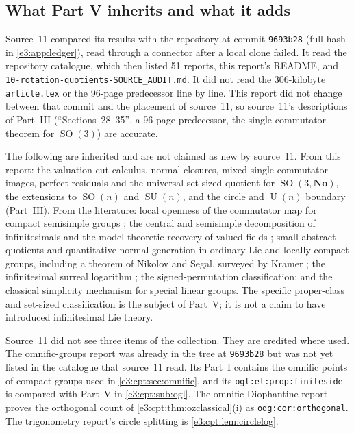 \documentclass[11pt,letterpaper]{article}
\numberwithin{equation}{section}
\theoremstyle{definition}
\theoremstyle{remark}
\newcommand{\No}{\mathbf{No}}
\newcommand{\SO}{\operatorname{SO}}
\newcommand{\SU}{\operatorname{SU}}
\newcommand{\Un}{\operatorname{U}}
\begin{document}
\subsection{What Part V inherits and what it adds}\label{e3:cpt:sub:inherited}

Source~11 compared its results with the repository at commit \texttt{9693b28}
(full hash in \cref{e3:app:ledger}), read through a connector after a local
clone failed. It read the repository catalogue, which then listed
51 reports, this report's README, and
\texttt{10-rotation-quotients-SOURCE\_AUDIT.md}. It did not read the
306-kilobyte \texttt{article.tex} or the 96-page predecessor line by line. This
report did not change between that commit and the placement of source~11, so
source~11's descriptions of Part~III (``Sections~28--35'', a 96-page
predecessor, the single-commutator theorem for $\SO(3)$) are accurate.

The following are inherited and are not claimed as new by source~11. From this
report: the valuation-cut calculus, normal closures, mixed single-commutator
images, perfect residuals and the universal set-sized quotient for
$\SO(3,\No)$, the extensions to $\SO(n)$ and $\SU(n)$, and the circle and
$\Un(n)$ boundary (Part~III). From the literature: local openness of the
commutator map for compact semisimple groups \cite{DM}; the central and
semisimple decomposition of infinitesimals and the model-theoretic recovery of
valued fields \cite{BP}; small abstract quotients and quantitative normal
generation in ordinary Lie and locally compact groups, including a theorem of
Nikolov and Segal, surveyed by Kramer \cite{Kramer}; the infinitesimal surreal
logarithm \cite{BG,Gonshor}; the signed-permutation classification; and the
classical simplicity mechanism for special linear groups. The specific
proper-class and set-sized classification is the subject of Part~V; it is not a
claim to have introduced infinitesimal Lie theory.

Source~11 did not see three items of the collection. They are credited where
used. The omnific-groups report \cite{RepoOGL} was already in the tree at
\texttt{9693b28} but was not yet listed in the catalogue that source~11 read.
Its Part~I contains the omnific points of compact groups used in
\cref{e3:cpt:sec:omnific}, and its \texttt{ogl:el:prop:finiteside} is compared
with Part~V in \cref{e3:cpt:sub:ogl}. The omnific Diophantine report
\cite{RepoODG} proves the orthogonal count of \cref{e3:cpt:thm:ozclassical}(i)
as \texttt{odg:cor:orthogonal}. The trigonometry report's circle splitting
\cite{RepoTrig} is \cref{e3:cpt:lem:circlelog}.
\end{document}
